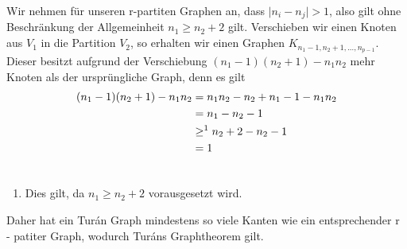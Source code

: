 \documentclass[12pt, a4paper]{article}
\begin{document}
Wir nehmen für unseren r-partiten Graphen an, dass $\mid n_i - n_j \mid > 1$, also gilt ohne Beschränkung der Allgemeinheit $n_1 \ge n_2 + 2$ gilt.
Verschieben wir einen Knoten aus $V_1$ in die Partition $V_2$, so erhalten wir einen Graphen $K_{n_1 - 1, n_2 + 1,...,n_{p - 1}}$. Dieser besitzt aufgrund der Verschiebung $(n_1 - 1)(n_2 + 1) - n_1 n_2$ mehr Knoten als der ursprüngliche Graph, denn es gilt
\begin{gather}
\begin{split}(n_1 - 1)(n_2 + 1) - n_1 n_2 &= n_1 n_2 - n_2 + n_1 - 1 - n_1 n_2 \\
&= n_1 - n_2 - 1 \\
&\ge^1 n_2 + 2 - n_2 - 1 \\
&= 1\end{split}\notag\\\begin{split}\end{split}\notag
\end{gather}\begin{enumerate}
\item {}
Dies gilt, da $n_1 \ge n_2 + 2$ vorausgesetzt wird.

\end{enumerate}

Daher hat ein Turán Graph mindestens so viele Kanten wie ein entsprechender r - patiter Graph, wodurch Turáns Graphtheorem gilt.
\end{document}
